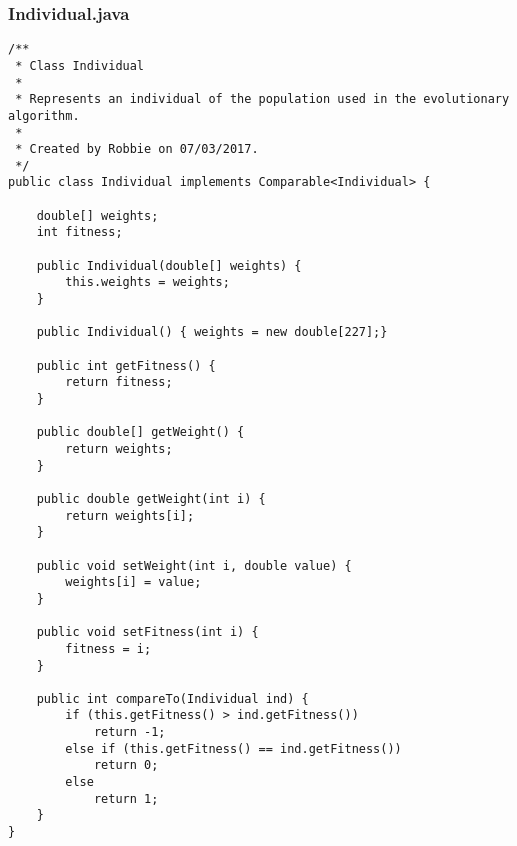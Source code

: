 \documentclass[12pt,a4paper]{article}
\begin{document}
\subsubsection{Individual.java}
\begin{lstlisting}
/**
 * Class Individual
 *
 * Represents an individual of the population used in the evolutionary algorithm.
 *
 * Created by Robbie on 07/03/2017.
 */
public class Individual implements Comparable<Individual> {

    double[] weights;
    int fitness;

    public Individual(double[] weights) {
        this.weights = weights;
    }

    public Individual() { weights = new double[227];}

    public int getFitness() {
        return fitness;
    }

    public double[] getWeight() {
        return weights;
    }

    public double getWeight(int i) {
        return weights[i];
    }

    public void setWeight(int i, double value) {
        weights[i] = value;
    }

    public void setFitness(int i) {
        fitness = i;
    }

    public int compareTo(Individual ind) {
        if (this.getFitness() > ind.getFitness())
            return -1;
        else if (this.getFitness() == ind.getFitness())
            return 0;
        else
            return 1;
    }
}
\end{lstlisting}
\newpage
\end{document}
